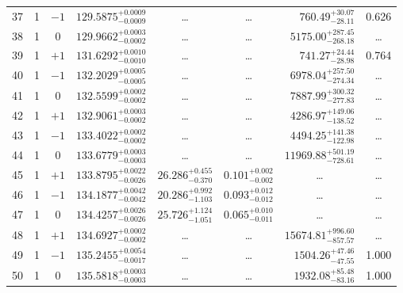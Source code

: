 \begin{table*}[!]
\begin{tabular}{llcrrlrc}
37 & 1 & $-1$ & $    129.5875_{-      0.0009}^{+      0.0009}$ & \multicolumn{1}{c}{\dots} & \multicolumn{1}{c}{\dots} & $      760.49_{-       28.11}^{+       30.07}$ & 0.626\\[1pt]
38 & 1 & 0 & $    129.9662_{-      0.0002}^{+      0.0003}$ & \multicolumn{1}{c}{\dots} & \multicolumn{1}{c}{\dots} & $     5175.00_{-      268.18}^{+      287.45}$ & \dots \\[1pt]
39 & 1 & $+1$ & $    131.6292_{-      0.0010}^{+      0.0010}$ & \multicolumn{1}{c}{\dots} & \multicolumn{1}{c}{\dots} & $      741.27_{-       28.98}^{+       24.44}$ & 0.764\\[1pt]
40 & 1 & $-1$ & $    132.2029_{-      0.0005}^{+      0.0005}$ & \multicolumn{1}{c}{\dots} & \multicolumn{1}{c}{\dots} & $     6978.04_{-      274.34}^{+      257.50}$ & \dots \\[1pt]
41 & 1 & 0 & $    132.5599_{-      0.0002}^{+      0.0002}$ & \multicolumn{1}{c}{\dots} & \multicolumn{1}{c}{\dots} & $     7887.99_{-      277.83}^{+      300.32}$ & \dots \\[1pt]
42 & 1 & $+1$ & $    132.9061_{-      0.0002}^{+      0.0003}$ & \multicolumn{1}{c}{\dots} & \multicolumn{1}{c}{\dots} & $     4286.97_{-      138.52}^{+      149.06}$ & \dots \\[1pt]
43 & 1 & $-1$ & $    133.4022_{-      0.0002}^{+      0.0002}$ & \multicolumn{1}{c}{\dots} & \multicolumn{1}{c}{\dots} & $     4494.25_{-      122.98}^{+      141.38}$ & \dots \\[1pt]
44 & 1 & 0 & $    133.6779_{-      0.0003}^{+      0.0003}$ & \multicolumn{1}{c}{\dots} & \multicolumn{1}{c}{\dots} & $    11969.88_{-      728.61}^{+      501.19}$ & \dots \\[1pt]
45 & 1 & $+1$ & $    133.8795_{-      0.0026}^{+      0.0022}$ & $      26.286_{-       0.370}^{+       0.455}$ & $       0.101_{-       0.002}^{+       0.002}$ & \multicolumn{1}{c}{\dots} & \dots \\[1pt]
46 & 1 & $-1$ & $    134.1877_{-      0.0042}^{+      0.0042}$ & $      20.286_{-       1.103}^{+       0.992}$ & $       0.093_{-       0.012}^{+       0.012}$ & \multicolumn{1}{c}{\dots} & \dots \\[1pt]
47 & 1 & 0 & $    134.4257_{-      0.0026}^{+      0.0026}$ & $      25.726_{-       1.051}^{+       1.124}$ & $       0.065_{-       0.011}^{+       0.010}$ & \multicolumn{1}{c}{\dots} & \dots \\[1pt] 
48 & 1 & $+1$ & $    134.6927_{-      0.0002}^{+      0.0002}$ & \multicolumn{1}{c}{\dots} & \multicolumn{1}{c}{\dots} & $    15674.81_{-      857.57}^{+      996.60}$ & \dots \\[1pt]
49 & 1 & $-1$ & $    135.2455_{-      0.0017}^{+      0.0054}$ & \multicolumn{1}{c}{\dots} & \multicolumn{1}{c}{\dots} & $     1504.26_{-       47.55}^{+       47.46}$ & 1.000\\[1pt]
50 & 1 & 0 & $    135.5818_{-      0.0003}^{+      0.0003}$ & \multicolumn{1}{c}{\dots} & \multicolumn{1}{c}{\dots} & $     1932.08_{-       83.16}^{+       85.48}$ & 1.000\\[1pt]
\hline
\end{tabular}
\end{table*}
